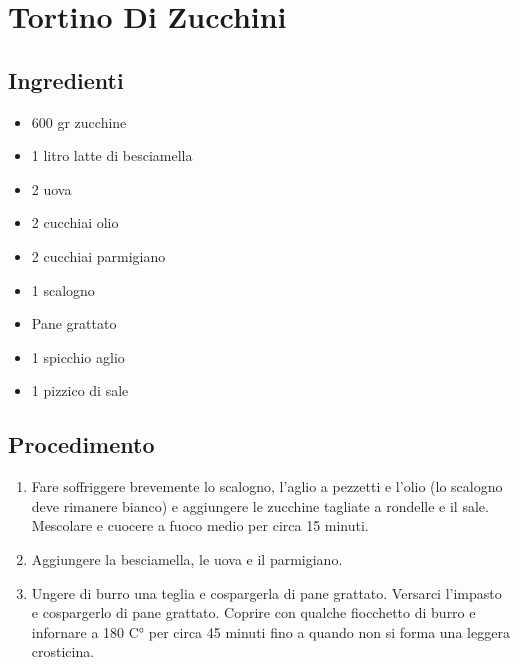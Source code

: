 \section{Tortino Di Zucchini}
\subsection{Ingredienti}
\begin{itemize}
\item 600 gr zucchine  
\item 1 litro latte di besciamella  
\item 2 uova  
\item 2 cucchiai olio  
\item 2 cucchiai parmigiano  
\item 1 scalogno  
\item Pane grattato  
\item 1 spicchio aglio  
\item 1 pizzico di sale
\end{itemize}
\subsection{Procedimento}
\begin{enumerate}
\item  Fare soffriggere brevemente lo scalogno, l'aglio a pezzetti e l'olio (lo scalogno deve rimanere bianco) e aggiungere le zucchine tagliate a rondelle e il sale. Mescolare e cuocere a fuoco medio per circa 15 minuti.  
\item  Aggiungere la besciamella, le uova e il parmigiano.  
\item  Ungere di burro una teglia e cospargerla di pane grattato. Versarci l'impasto e cospargerlo di pane grattato. Coprire con qualche fiocchetto di burro e infornare a 180 C° per circa 45 minuti fino a quando non si forma una leggera crosticina.
\end{enumerate}
